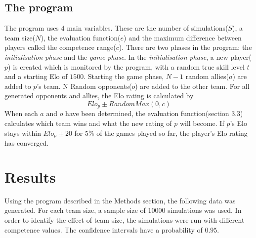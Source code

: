 \documentclass[12pt]{article}
\begin{document}
\subsection{The program}
The program uses 4 main variables. These are the number of simulations($S$), a team size($N$), the evaluation function($e$)  and the maximum difference between players called the competence range($c$). There are two phases in the program: the \textit{initialisation phase} and the \textit{game phase}. In the \textit{initialisation phase}, a new player($p$) is created which is monitored by the program, with a random true skill level $t$  and a starting Elo of $1500$. Starting the game phase, $N - 1$ random allies($a$) are added to $p$’s team. N Random opponents($o$) are added to the other team. For all generated opponents and allies, the Elo rating is calculated by
\[Elo_p \pm RandomMax(0,c)\]
When each $a$ and $o$ have been determined, the evaluation function(section 3.3) calculates which team wins and what the new rating of $p$ will become. If $p$'s Elo stays within $Elo_p \pm 20$ for 5\% of the games played so far, the player's Elo rating has converged.

\section{Results}
Using the program described in the Methods section, the following data was generated.
For each team size, a sample size of $10000$ simulations was used. In order to identify the effect of team size, the simulations were run with different competence values. The confidence intervals have a probability of $0.95$.
\end{document}
